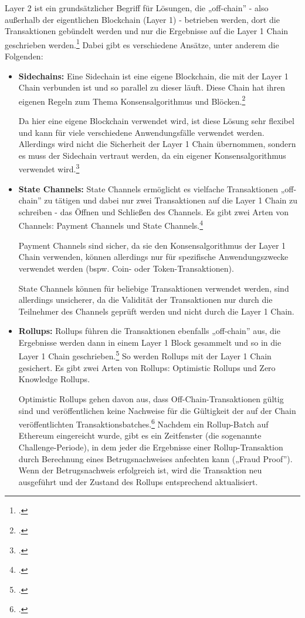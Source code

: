 \documentclass[12pt, a4paper]{article}
\begin{document}
{Layer 2 ist ein grundsätzlicher Begriff für Lösungen, die „off-chain” - also außerhalb der eigentlichen Blockchain (Layer 1) - betrieben werden, dort die Transaktionen gebündelt werden und nur die Ergebnisse auf die Layer 1 Chain geschrieben werden.\footcite[Vgl.][]{w18}
Dabei gibt es verschiedene Ansätze, unter anderem die Folgenden:
\begin{itemize}
    \item \textbf{Sidechains:} 
    Eine Sidechain ist eine eigene Blockchain, die mit der Layer 1 Chain verbunden ist und so parallel zu dieser läuft. 
    Diese Chain hat ihren eigenen Regeln zum Thema Konsensalgorithmus und Blöcken.\footcite[Vgl. hierzu und weiterführend][]{w20}

    \noindent
    Da hier eine eigene Blockchain verwendet wird, ist diese Lösung sehr flexibel und kann für viele verschiedene Anwendungsfälle verwendet werden.
    Allerdings wird nicht die Sicherheit der Layer 1 Chain übernommen, sondern es muss der Sidechain vertraut werden, da ein eigener Konsensalgorithmus verwendet wird.\footcite[Vgl.][]{w21}


    \item \textbf{State Channels:}
    State Channels ermöglicht es vielfache Transaktionen „off-chain” zu tätigen und dabei nur zwei Transaktionen auf die Layer 1 Chain zu schreiben - das Öffnen und Schließen des Channels.
    Es gibt zwei Arten von Channels: Payment Channels und State Channels.\footcite[Vgl. hierzu und zum Folgenden sowie weiterführend][]{w19}

    \noindent
    Payment Channels sind sicher, da sie den Konsensalgorithmus der Layer 1 Chain verwenden, können allerdings nur für spezifische Anwendungszwecke verwendet werden (bspw. Coin- oder Token-Transaktionen).

    \noindent
    State Channels können für beliebige Transaktionen verwendet werden, sind allerdings unsicherer, da die Validität der Transaktionen nur durch die Teilnehmer des Channels geprüft werden und nicht durch die Layer 1 Chain.


    \item \textbf{Rollups:}
    Rollups führen die Transaktionen ebenfalls „off-chain” aus, die Ergebnisse werden dann in einem Layer 1 Block gesammelt und so in die Layer 1 Chain geschrieben.\footcite[Vgl. hierzu und zum Folgenden][]{w18} 
    So werden Rollups mit der Layer 1 Chain gesichert.
    Es gibt zwei Arten von Rollups: Optimistic Rollups und Zero Knowledge Rollups.

    \noindent
    Optimistic Rollups gehen davon aus, dass Off-Chain-Transaktionen gültig sind und veröffentlichen keine Nachweise für die Gültigkeit der auf der Chain veröffentlichten Transaktionsbatches.\footcite[Vgl. hierzu und zum Folgenden sowie weiterführend][]{w22}
    Nachdem ein Rollup-Batch auf Ethereum eingereicht wurde, gibt es ein Zeitfenster (die sogenannte Challenge-Periode), in dem jeder die Ergebnisse einer Rollup-Transaktion durch Berechnung eines Betrugsnachweises anfechten kann („Fraud Proof”).
    Wenn der Betrugsnachweis erfolgreich ist, wird die Transaktion neu ausgeführt und der Zustand des Rollups entsprechend aktualisiert.


\end{itemize}}
\end{document}
